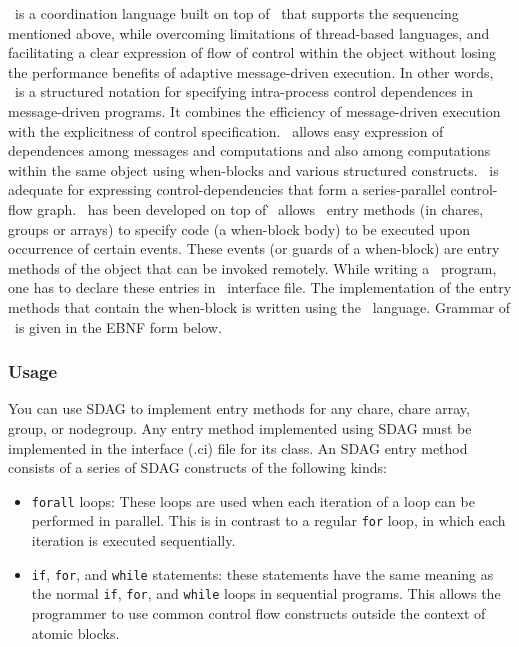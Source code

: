 \sdag\ is a coordination language built on top of \charmpp\ that supports the
sequencing mentioned above, while overcoming limitations of thread-based
languages, and facilitating a clear expression of flow of control within the
object without losing the performance benefits of adaptive message-driven
execution.  In other words, \sdag\ is a structured notation for specifying
intra-process control dependences in message-driven programs. It combines the
efficiency of message-driven execution with the explicitness of control
specification. \sdag\ allows easy expression of dependences among messages and
computations and also among computations within the same object using
when-blocks and various structured constructs.  \sdag\ is adequate for
expressing control-dependencies that form a series-parallel control-flow graph.
\sdag\ has been developed on top of \charmpp\. \sdag\ allows \charmpp\ entry
methods (in chares, groups or arrays) to specify code (a when-block body) to be
executed upon occurrence of certain events.  These events (or guards of a
when-block) are entry methods of the object that can be invoked remotely. While
writing a \sdag\ program, one has to declare these entries in \charmpp\
interface file. The implementation of the entry methods that contain the
when-block is written using the \sdag\ language. Grammar of \sdag\ is given in
the EBNF form below.

\subsubsection{Usage}

You can use SDAG to implement entry methods for any chare, chare array, group,
or nodegroup. Any entry method implemented using SDAG must be implemented in the
interface (.ci) file for its class. An SDAG entry method consists of a series of
SDAG constructs of the following kinds:

\begin{itemize}
    \item {\tt forall} loops: These loops are used when each iteration of a loop
        can be performed in parallel. This is in contrast to a regular {\tt for}
        loop, in which each iteration is executed sequentially.
    \item {\tt if}, {\tt for}, and {\tt while} statements: these statements have
        the same meaning as the normal {\tt if}, {\tt for}, and {\tt while}
        loops in sequential \CC programs. This allows the programmer to use
        common control flow constructs outside the context of atomic blocks.
\end{itemize}

